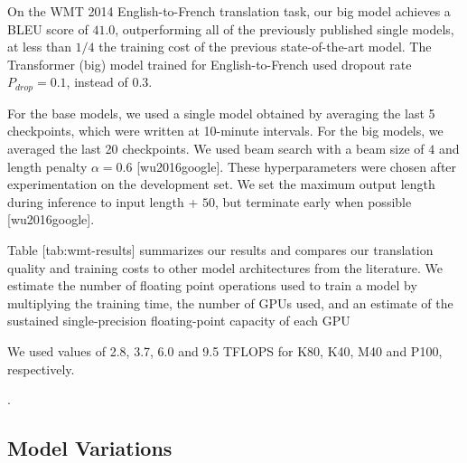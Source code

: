 \documentclass[11pt,a4paper]{article}
\begin{document}
On the WMT 2014 English-to-French translation task, our big model achieves a BLEU score of $41.0$, outperforming all of the previously published single models, at less than $1/4$ the training cost of the previous state-of-the-art model. The Transformer (big) model trained for English-to-French used dropout rate $P_{drop}=0.1$, instead of $0.3$.

For the base models, we used a single model obtained by averaging the last 5 checkpoints, which were written at 10-minute intervals.  For the big models, we averaged the last 20 checkpoints. We used beam search with a beam size of $4$ and length penalty $\alpha=0.6$ [wu2016google].  These hyperparameters were chosen after experimentation on the development set.  We set the maximum output length during inference to input length + $50$, but terminate early when possible [wu2016google].

Table [tab:wmt-results] summarizes our results and compares our translation quality and training costs to other model architectures from the literature.  We estimate the number of floating point operations used to train a model by multiplying the training time, the number of GPUs used, and an estimate of the sustained single-precision floating-point capacity of each GPU

We used values of 2.8, 3.7, 6.0 and 9.5 TFLOPS for K80, K40, M40 and P100, respectively.

.

\subsection{Model Variations}
\end{document}
